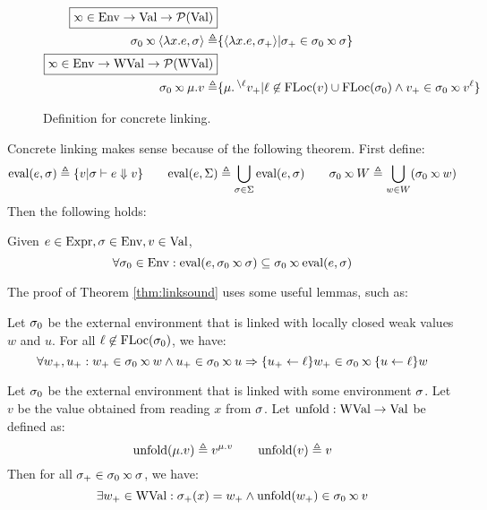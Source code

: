\documentclass{article}
\begin{document}
\begin{figure}
\begin{align*}
		\fbox{$\semlink\in\Ctx\rightarrow\Value\rightarrow\pset(\Value)$}                                                                                                                               \\
		\ctx_0\semlink\langle\lambda x.e,\ctx\rangle\triangleq & \{\langle\lambda x.e,\ctx_+\rangle|\ctx_+\in\ctx_0\semlink\ctx\}                                                                       \\
		\fbox{$\semlink\in\Ctx\rightarrow\Walue\rightarrow\pset(\Walue)$}                                                                                                                               \\
		\ctx_0\semlink\mu.v\triangleq                          & \{\mu.\closeloc{\ell}{v_+}|\ell\not\in\FLoc(v)\cup\FLoc(\ctx_0)\land v_+\in\ctx_0\semlink\openloc{\ell}{v}\}
	\end{align*}
	\caption{Definition for concrete linking.}
	\label{fig:conclink}
\end{figure}

Concrete linking makes sense because of the following theorem.
First define:
\[\eval(e,\ctx)\triangleq\{v|\ctx\vdash e\Downarrow v\}\qquad\eval(e,\Sigma)\triangleq\bigcup_{\ctx\in\Sigma}\eval(e,\ctx)\qquad\ctx_0\semlink W\triangleq\bigcup_{w\in W}(\ctx_0\semlink w)\]
Then the following holds:
\begin{thm}\label{thm:linksound}
	Given $e\in\Expr,\ctx\in\Ctx,v\in\Value$,
	\[\forall\ctx_0\in\Ctx:\eval(e,\ctx_0\semlink\ctx)\subseteq\ctx_0\semlink\eval(e,\ctx)\]
\end{thm}

The proof of Theorem \ref{thm:linksound} uses some useful lemmas, such as:
\begin{lem}
	Let $\ctx_0$ be the external environment that is linked with locally closed weak values $w$ and $u$.
	For all $\ell\not\in\FLoc(\ctx_0)$, we have:
	\[\forall w_+,u_+:w_+\in\ctx_0\semlink w\wedge u_+\in\ctx_0\semlink u\Rightarrow\{u_+\leftarrow\ell\}w_+\in\ctx_0\semlink\{u\leftarrow\ell\}w\]
\end{lem}
\begin{lem}
	Let $\ctx_0$ be the external environment that is linked with some environment $\ctx$.
	Let $v$ be the value obtained from reading $x$ from $\ctx$.
	Let $\text{unfold}:\Walue\rightarrow\Value$ be defined as:
	\[\text{unfold}(\mu.v)\triangleq\openloc{\mu.v}{v}\qquad\text{unfold}(v)\triangleq v\]
	Then for all $\ctx_+\in\ctx_0\semlink\ctx$, we have:
	\[\exists w_+\in\Walue:\ctx_+(x)=w_+\land\text{unfold}(w_+)\in\ctx_0\semlink v\]
\end{lem}
\clearpage
\end{document}
